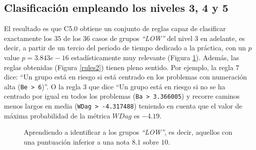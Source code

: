 \subsection{Clasificación empleando los niveles 3, 4 y 5}

El resultado es que C5.0 obtiene un conjunto de reglas capaz de clasificar exactamente los $35$ de los $36$ casos de grupos \emph{``LOW''} del nivel $3$ en adelante, es decir, a partir de un tercio del periodo de tiempo dedicado a la práctica, con un $p$ value $p = 3.843e-16$ estadísticamente muy relevante (Figura \ref{fig:cm2}). Además, las reglas obtenidas (Figura \ref{rules2}) tienen pleno sentido. Por ejemplo, la regla $7$ dice: ``Un grupo está en riesgo si está centrado en los problemas con numeración alta (\texttt{Be > 6})''. O la regla $3$ que dice ``Un grupo está en riesgo si no se ha centrado por igual en todos los problemas (\texttt{Ba > 3.366005}) y recorre caminos menos largos en media (\texttt{WDag > -4.317488}) teniendo en cuenta que el valor de máxima probabilidad de la métrica $WDag$ es $-4.19$.

\begin{figure}[H]
\centering
{}
\caption{Aprendiendo a identificar a los grupos \emph{``LOW''}, es decir, aquellos con una puntuación inferior a una nota $8.1$ sobre $10$.}
\label{fig:cm2}
\end{figure}

